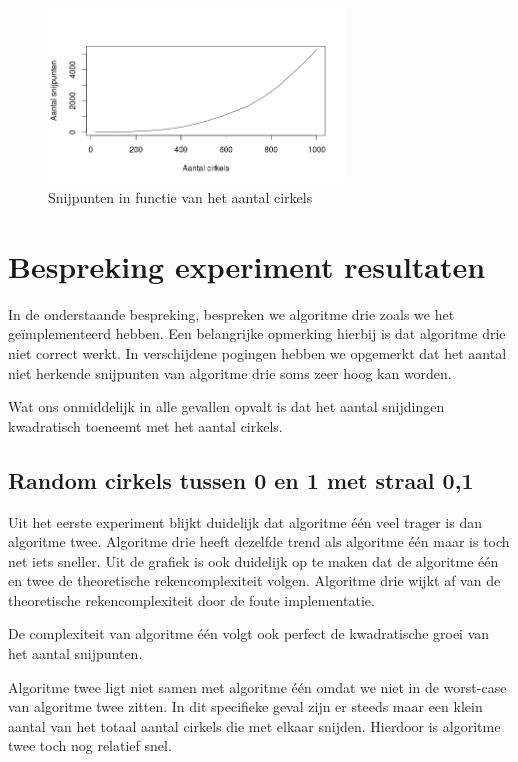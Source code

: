 \documentclass[11pt,a4paper]{article}
\begin{document}
\begin{figure}[H]
\centering
\includegraphics[width=0.7\textwidth]{snijpunten_100.png}
\caption*{Snijpunten in functie van het aantal cirkels}
\end{figure}

\section{Bespreking experiment resultaten}

In de onderstaande bespreking, bespreken we algoritme drie zoals we het ge\"implementeerd hebben. Een belangrijke opmerking hierbij is dat algoritme drie niet correct werkt. In verschijdene pogingen hebben we opgemerkt dat het aantal niet herkende snijpunten van algoritme drie soms zeer hoog kan worden.

Wat ons onmiddelijk in alle gevallen opvalt is dat het aantal snijdingen kwadratisch toeneemt met het aantal cirkels.

\subsection{Random cirkels tussen 0 en 1 met straal 0,1}

Uit het eerste experiment blijkt duidelijk dat algoritme \'e\'en veel trager is dan algoritme twee. Algoritme drie heeft dezelfde trend als algoritme \'e\'en maar is toch net iets sneller. Uit de grafiek is ook duidelijk op te maken dat de algoritme \'e\'en en twee de theoretische rekencomplexiteit volgen. Algoritme drie wijkt af van de theoretische rekencomplexiteit door de foute implementatie.

De complexiteit van algoritme \'e\'en volgt ook perfect de kwadratische groei van het aantal snijpunten.

Algoritme twee ligt niet samen met algoritme \'e\'en omdat we niet in de worst-case van algoritme twee zitten. In dit specifieke geval zijn er steeds maar een klein aantal van het totaal aantal cirkels die met elkaar snijden. Hierdoor is algoritme twee toch nog relatief snel.
\end{document}
